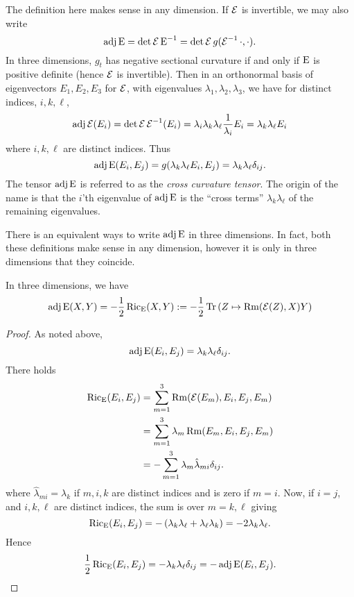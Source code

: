 \documentclass[a4paper,12pt]{amsart}
\begin{document}
The definition here makes sense in any dimension. If \(\operatorname{\mathcal{E}}\) is invertible, we may also write
\[
\operatorname{adj}\operatorname{E} = \det \operatorname{\mathcal{E}} \operatorname{E}^{-1} = \det\operatorname{\mathcal{E}} g(\operatorname{\mathcal{E}}^{-1} \cdot, \cdot).
\]
In three dimensions, \(g_t\) has negative sectional curvature if and only if \(\operatorname{E}\) is positive definite (hence \(\operatorname{\mathcal{E}}\) is invertible). Then in an orthonormal basis of eigenvectors \(E_1, E_2, E_3\) for \(\operatorname{\mathcal{E}}\), with eigenvalues \(\lambda_1, \lambda_2, \lambda_3\), we have for distinct indices, \(i, k, \ell\),
\[
\operatorname{adj}\operatorname{\mathcal{E}} (E_i) = \det\operatorname{\mathcal{E}} \operatorname{\mathcal{E}}^{-1}(E_i) = \lambda_i \lambda_k \lambda_{\ell} \frac{1}{\lambda_i} E_i = \lambda_k \lambda_{\ell} E_i
\]
where \(i,k,\ell\) are distinct indices. Thus
\begin{equation}
\label{eq:cross_curvature}
\operatorname{adj}\operatorname{E}(E_i, E_j) = g(\lambda_k \lambda_{\ell} E_i, E_j) = \lambda_k \lambda_{\ell} \delta_{ij}.
\end{equation}
The tensor \(\operatorname{adj}\operatorname{E}\) is referred to as the \emph{cross curvature tensor}. The origin of the name is that the \(i\)'th eigenvalue of \(\operatorname{adj}\operatorname{E}\) is the ``cross terms'' \(\lambda_k \lambda_{\ell}\) of the remaining eigenvalues.

There is an equivalent ways to write \(\operatorname{adj}\operatorname{E}\) in three dimensions. In fact, both these definitions make sense in any dimension, however it is only in three dimensions that they coincide.
\begin{lemma}
\label{lem:xcf_equiv}

In three dimensions, we have
\[
\operatorname{adj}\operatorname{E}(X, Y) = -\frac{1}{2} \operatorname{Ric}_{\operatorname{E}} (X, Y) :=- \frac{1}{2} \operatorname{Tr} \left(Z \mapsto \operatorname{Rm}(\operatorname{\mathcal{E}}(Z), X) Y\right)
\]
\end{lemma}
\begin{proof}
As noted above,
\[
\operatorname{adj}\operatorname{E}(E_i, E_j) = \lambda_k \lambda_{\ell} \delta_{ij}.
\]
There holds
\[
\begin{split}
\operatorname{Ric}_{\operatorname{E}}(E_i, E_j) &= \sum_{m=1}^3 \operatorname{Rm}(\operatorname{\mathcal{E}}(E_m), E_i, E_j, E_m) \\
&= \sum_{m=1}^3 \lambda_m \operatorname{Rm}(E_m, E_i, E_j, E_m) \\
&= -\sum_{m=1}^3 \lambda_m \hat{\lambda}_{mi}\delta_{ij}.
\end{split}
\]
where \(\hat{\lambda}_{mi} = \lambda_k\) if \(m,i,k\) are distinct indices and is zero if \(m=i\). Now, if \(i = j\), and \(i, k, \ell\) are distinct indices, the sum is over \(m=k, \ell\) giving
\[
\operatorname{Ric}_{\operatorname{E}}(E_i, E_j) = -\left(\lambda_k \lambda_{\ell} + \lambda_{\ell} \lambda_k\right) = -2\lambda_k \lambda_{\ell}.
\]
Hence
\[
\frac{1}{2} \operatorname{Ric}_{\operatorname{E}}(E_i, E_j) =  -\lambda_k \lambda_{\ell} \delta_{ij} = -\operatorname{adj}\operatorname{E}(E_i, E_j).
\]
\end{proof}
\end{document}
